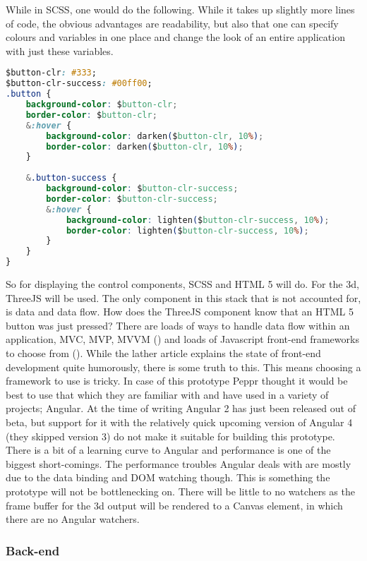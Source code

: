 \clearpage
While in SCSS, one would do the following. While it takes up slightly more lines of code, the obvious advantages are readability, but also that one can specify colours and variables in one place and change the look of an entire application with just these variables.

\begin{lstlisting}[language=CSS]
$button-clr: #333;
$button-clr-success: #00ff00;
.button {
	background-color: $button-clr;
	border-color: $button-clr;
	&:hover {
		background-color: darken($button-clr, 10%);
		border-color: darken($button-clr, 10%);
	}
	
	&.button-success {
		background-color: $button-clr-success;
		border-color: $button-clr-success;
		&:hover {
			background-color: lighten($button-clr-success, 10%);
			border-color: lighten($button-clr-success, 10%);
		}
	}
}
\end{lstlisting}

So for displaying the control components, SCSS and HTML 5 will do. For the 3d, ThreeJS will be used. The only component in this stack that is not accounted for, is data and data flow. How does the ThreeJS component know that an HTML 5 button was just pressed? There are loads of ways to handle data flow within an application, MVC, MVP, MVVM (\cite{MVCMVPMVVM}) and loads of Javascript front-end frameworks to choose from (\cite{javascriptAnno2016}). While the lather article explains the state of front-end development quite humorously, there is some truth to this. This means choosing a framework to use is tricky. In case of this prototype Peppr thought it would be best to use that which they are familiar with and have used in a variety of projects; Angular. At the time of writing Angular 2 has just been released out of beta, but support for it with the relatively quick upcoming version of Angular 4 (they skipped version 3) do not make it suitable for building this prototype.
There is a bit of a learning curve to Angular and performance is one of the biggest short-comings. The performance troubles Angular deals with are mostly due to the data binding and DOM watching though. This is something the prototype will not be bottlenecking on. There will be little to no watchers as the frame buffer for the 3d output will be rendered to a Canvas element, in which there are no Angular watchers.

\subsubsection{Back-end}
\label{subsub: backEnd}

